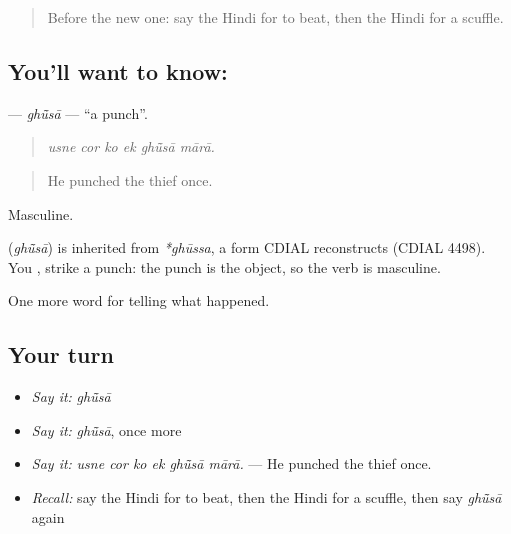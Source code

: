 \label{lesson:HI-C319-ghusa}



\begin{quote}
Before the new one: say the Hindi for to beat, then the Hindi for a scuffle.
\end{quote}

\subsection*{You'll want to know: }
\textbf{} — \emph{ghū̃sā} — \textquotedblleft{}a punch\textquotedblright{}.

\begin{quote}
     
\end{quote}

\begin{quote}
\emph{usne cor ko ek ghū̃sā mārā.}
\end{quote}

\begin{quote}
He punched the thief once.
\end{quote}

Masculine.

\begin{cousinweb}
\textbf{} (\emph{ghū̃sā}) is inherited from \emph{*ghūssa}, a form CDIAL reconstructs (CDIAL 4498). You \textbf{ }, strike a punch: the punch is the object, so the verb is masculine.
\end{cousinweb}

\begin{grammarlens}[title={What you've built}]
One more word for telling what happened.
\end{grammarlens}

\subsection*{Your turn}
\begin{itemize}
\raggedright
  \item \emph{Say it:} \emph{ghū̃sā}
  \item \emph{Say it:} \emph{ghū̃sā}, once more
  \item \emph{Say it:} \emph{usne cor ko ek ghū̃sā mārā.} — He punched the thief once.
  \item \emph{Recall:} say the Hindi for to beat, then the Hindi for a scuffle, then say \emph{ghū̃sā} again
\end{itemize}

